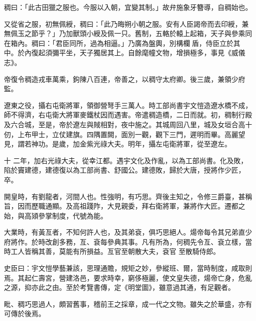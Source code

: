 \begin{pinyinscope}
 稠曰：「此古田獵之服也。今服以入朝，宜變其制。」故弁施象牙簪導，自稠始也。



 又從省之服，初無佩綬，稠曰：「此乃晦朔小朝之服。安有人臣謁帝而去印綬，兼無佩玉之節乎？」乃加獸頭小綬及佩一只。舊制，五輅於轅上起箱，天子與參乘同在箱內。稠曰：「君臣同所，過為相逼。」乃廣為盤輿，別構欄盾，侍臣立於其
 中。於內復起須彌平坐，天子獨居其上。自餘麾幢文物，增損極多，事見《威儀志》。



 帝復令稠造戎車萬乘，鉤陳八百連，帝善之，以稠守太府卿。後三歲，兼領少府監。



 遼東之役，攝右屯衛將軍，領御營弩手三萬人。時工部尚書宇文愷造遼水橋不成，師不得濟，右屯衛大將軍麥鐵杖因而遇害。帝遣稠造橋，二日而就。初，稠制行殿及六合城，至是，帝於遼左與賊相對，夜中施之。其城周回八里，城及女垣合高十仞，上布甲士，立仗建旗。四隅置闕，面別一觀，觀下三門，遲明而畢。高麗望見，謂若神功。是歲，加金紫光祿大夫。明年，攝左屯衛將軍，從至遼左。



 十
 二年，加右光祿大夫，從幸江都。遇宇文化及作亂，以為工部尚書。化及敗，陷於竇建德，建德復以為工部尚書、舒國公。建德敗，歸於大唐，授將作少匠，卒。



 開皇時，有劉龍者，河間人也。性強明，有巧思。齊後主知之，令修三爵臺，甚稱旨，因而歷職通顯。及高祖踐阼，大見親委，拜右衛將軍，兼將作大匠。遷都之始，與高熲參掌制度，代號為能。



 大業時，有黃亙者，不知何許人也，及其弟袞，俱巧思絕人。煬帝每令其兄弟直少府將作。於時改創多務，亙、袞每參典其事。凡有所為，何稠先令亙、袞立樣，當時工人皆稱其善，莫能有所損益。亙官至朝散大夫，袞官
 至散騎侍郎。



 史臣曰：宇文愷學藝兼該，思理通贍，規矩之妙，參縱班、爾，當時制度，咸取則焉。其起仁壽宮，營建洛邑，要求時幸，窮侈極麗，使文皇失德，煬帝亡身，危亂之源，抑亦此之由。至於考覽書傳，定《明堂圖》，雖意過其通，有足觀者。



 毗、稠巧思過人，頗習舊事，稽前王之採章，成一代之文物。雖失之於華盛，亦有可傳於後焉。



\end{pinyinscope}